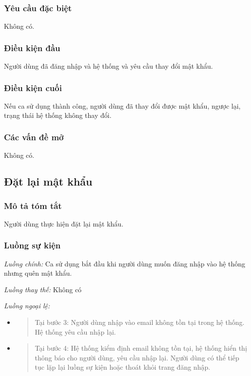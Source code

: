 \documentclass[./../main.tex]{subfiles}
\begin{document}
\subsubsection*{Yêu cầu đặc biệt}

Không có.

\subsubsection*{Điều kiện đầu}

Người dùng đã đăng nhập và hệ thống và yêu cầu thay đổi mật khẩu.

\subsubsection*{Điều kiện cuối}

Nếu ca sử dụng thành công, người dùng đã thay đổi được mật khẩu, ngược
lại, trạng thái hệ thống không thay đổi.

\subsubsection*{Các vấn đề mở}

Không có.

\subsection{Đặt lại mật khẩu}
\subsubsection*{Mô tả tóm tắt}

Người dùng thực hiện đặt lại mật khẩu.

\subsubsection*{Luồng sự kiện}

\emph{Luồng chính:} Ca sử dụng bắt đầu khi người dùng muốn đăng nhập vào
hệ thống nhưng quên mật khẩu.

\emph{Luồng thay thế:} Không có

\emph{Luồng ngoại lệ:}

\begin{itemize}
\item
  \begin{quote}
  Tại bước 3: Người dùng nhập vào email không tồn tại trong hệ thống. Hệ
  thống yêu cầu nhập lại.
  \end{quote}
\item
  \begin{quote}
  Tại bước 4: Hệ thống kiểm định email không tồn tại, hệ thống hiển thị
  thông báo cho người dùng, yêu cầu nhập lại. Người dùng có thể tiếp tục
  lặp lại luồng sự kiện hoặc thoát khỏi trang đăng nhập.
  \end{quote}
\end{itemize}
\end{document}
